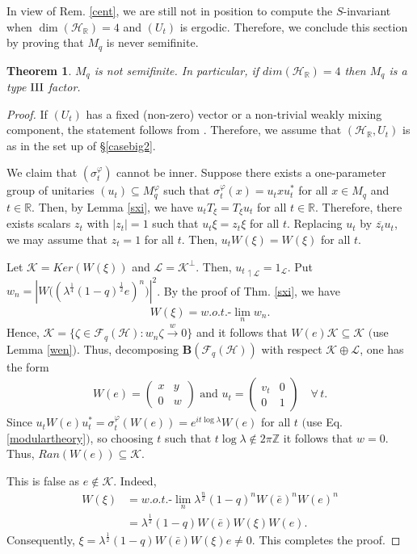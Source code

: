 \documentclass[12pt, a4paper,reqno]{amsart}
\newtheorem{Theorem}{Theorem}[section]
\theoremstyle{definition}
\def\R{\mathbb R}
\def\Z{\mathbb Z}
\newcommand{\CH}{\mathcal{H}}
\newcommand{\abs}[1]{\left\vert#1\right\vert}
\begin{document}
In view of Rem. \ref{cent}, we are still not in position to compute the $S$-invariant when $\dim(\CH_\R)=4$ and $(U_t)$ is ergodic. Therefore, we conclude this section by proving that $M_q$ is never semifinite. 

\begin{Theorem}\label{semi}
$M_q$ is not semifinite. In particular, if $dim(\CH_\R)=4$ then $M_q$ is a type $\rm{III}$ factor. 
\end{Theorem}

\begin{proof}
If $(U_t)$ has a fixed (non-zero) vector or a non-trivial weakly mixing component, the statement follows from \cite{bik-kunal}. 
Therefore, we assume that $(\CH_\R,U_t)$ is as in the set up of \S\ref{casebig2}. 

We claim that $(\sigma_t^\varphi)$ cannot be inner. Suppose there exists a one-parameter group of unitaries $(u_t)\subseteq M_q^\varphi$ such that $\sigma_t^\varphi(x) =u_tx u_t^*$ for all $x\in M_q$ and $t\in \R$. 
Then, by Lemma \ref{sxi}, we have $u_t T_{\xi} = T_{\xi} u_t$ for all $t\in \R$. Therefore, there exists scalars $z_t$ with $\abs{z_t}=1$ such that $u_t\xi =z_t\xi$ for all $t$. Replacing $u_t$ by $\overline{z_t}u_t$, we may assume that $z_t=1$ for all $t$. Then, $u_tW(\xi)= W(\xi)$ for all $t$. 

Let $\mathcal{K} = Ker(W(\xi))$ and $\mathcal{L}= \mathcal{K}^\perp$. Then, ${u_t}_{\upharpoonleft \mathcal{L}}=1_{\mathcal{L}}$. Put $w_n=\abs{W\big((\lambda^{\frac{1}{4}}(1-q)^{\frac{1}{2}}e)^n\big)}^2$. By the proof of Thm. \ref{sxi}, we have 
\begin{align*}
W(\xi) = w.o.t. \text{-}\lim_n w_n.
\end{align*}
Hence, $\mathcal{K}=\{\zeta\in \mathcal{F}_q(\CH): w_n\zeta\overset{w}\rightarrow 0\}$ and it follows that $W(e)\mathcal{K}\subseteq \mathcal{K}$ $($use Lemma \ref{wen}$)$. Thus, decomposing $\mathbf{B}(\mathcal{F}_q(\CH))$ with respect $\mathcal{K}\oplus\mathcal{L}$, one has the form
\begin{align*}
W(e)=\begin{pmatrix}x&y\\0&w\end{pmatrix} \text{ and }u_t=\begin{pmatrix}v_t&0\\0&1\end{pmatrix} \quad \forall\, t. 
\end{align*}
Since $u_tW(e)u_t^* = \sigma_t^\varphi(W(e)) = e^{it\log\lambda} W(e)$ for all $t$ $($use Eq. \eqref{modulartheory}$)$, so choosing $t$ such that $t\log\lambda\not\in2\pi\Z$ it follows that $w=0$. Thus,
$Ran(W(e))\subseteq \mathcal{K}$. 

This is false as $e\not\in\mathcal{K}$. Indeed, 
\begin{align*}
W(\xi)&=w.o.t.\text{-}\lim_n \lambda^{\frac{n}{2}}(1-q)^n W(\bar e)^nW(e)^n\\
&=\lambda^{\frac{1}{2}}(1-q)W(\bar e)W(\xi)W(e).
\end{align*}
Consequently, $\xi=\lambda^{\frac{1}{2}}(1-q)W(\bar e)W(\xi)e\neq 0$. This completes the proof. 
\end{proof}
\end{document}
